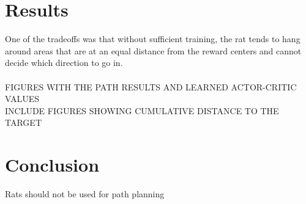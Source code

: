 \documentclass[conference]{IEEEtran}
\begin{document}
\section{Results}

One of the tradeoffs was that without sufficient training, the rat tends to hang around areas that are at an equal distance from the reward centers and cannot decide which direction to go in. \\
\\
FIGURES WITH THE PATH RESULTS AND LEARNED ACTOR-CRITIC VALUES\\
INCLUDE FIGURES SHOWING CUMULATIVE DISTANCE TO THE TARGET

\section{Conclusion}
Rats should not be used for path planning






\end{document}
